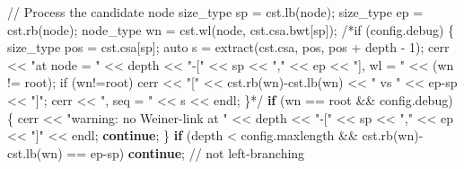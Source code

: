 \documentclass[
]{article}
\newenvironment{Shaded}{\begin{snugshade}}{\end{snugshade}}
\newcommand{\CommentTok}[1]{\textcolor[rgb]{0.48,0.49,0.49}{#1}}
\newcommand{\ControlFlowTok}[1]{\textcolor[rgb]{0.99,0.74,0.29}{\textbf{#1}}}
\newcommand{\NormalTok}[1]{\textcolor[rgb]{0.81,0.81,0.76}{#1}}
\newcommand{\OperatorTok}[1]{\textcolor[rgb]{0.81,0.81,0.76}{#1}}
\newcommand{\StringTok}[1]{\textcolor[rgb]{0.96,0.31,0.31}{#1}}
\begin{document}
\begin{Shaded}
\begin{Highlighting}[]
        \CommentTok{// Process the candidate node}
\NormalTok{        size\_type sp }\OperatorTok{=}\NormalTok{ cst}\OperatorTok{.}\NormalTok{lb}\OperatorTok{(}\NormalTok{node}\OperatorTok{);}
\NormalTok{        size\_type ep }\OperatorTok{=}\NormalTok{ cst}\OperatorTok{.}\NormalTok{rb}\OperatorTok{(}\NormalTok{node}\OperatorTok{);}
\NormalTok{        node\_type wn }\OperatorTok{=}\NormalTok{ cst}\OperatorTok{.}\NormalTok{wl}\OperatorTok{(}\NormalTok{node}\OperatorTok{,}\NormalTok{ cst}\OperatorTok{.}\NormalTok{csa}\OperatorTok{.}\NormalTok{bwt}\OperatorTok{[}\NormalTok{sp}\OperatorTok{]);}
        \CommentTok{/*if (config.debug)}
\CommentTok{        \{}
\CommentTok{            size\_type pos = cst.csa[sp];}
\CommentTok{            auto s = extract(cst.csa, pos, pos + depth {-} 1);}
\CommentTok{            cerr \textless{}\textless{} "at node = " \textless{}\textless{} depth \textless{}\textless{} "{-}[" \textless{}\textless{} sp \textless{}\textless{} "," \textless{}\textless{} ep \textless{}\textless{} "], wl = " \textless{}\textless{} (wn != root);}
\CommentTok{            if (wn!=root)}
\CommentTok{                cerr \textless{}\textless{} "[" \textless{}\textless{} cst.rb(wn){-}cst.lb(wn) \textless{}\textless{} " vs " \textless{}\textless{} ep{-}sp \textless{}\textless{} "]";}
\CommentTok{            cerr \textless{}\textless{} ", seq = " \textless{}\textless{} s \textless{}\textless{} endl;}
\CommentTok{            \}*/}
        \ControlFlowTok{if} \OperatorTok{(}\NormalTok{wn }\OperatorTok{==}\NormalTok{ root }\OperatorTok{\&\&}\NormalTok{ config}\OperatorTok{.}\NormalTok{debug}\OperatorTok{)}
        \OperatorTok{\{}
\NormalTok{            cerr }\OperatorTok{\textless{}\textless{}} \StringTok{"warning: no Weiner{-}link at "} \OperatorTok{\textless{}\textless{}}\NormalTok{ depth }\OperatorTok{\textless{}\textless{}} \StringTok{"{-}["} \OperatorTok{\textless{}\textless{}}\NormalTok{ sp }\OperatorTok{\textless{}\textless{}} \StringTok{","} \OperatorTok{\textless{}\textless{}}\NormalTok{ ep }\OperatorTok{\textless{}\textless{}} \StringTok{"]"} \OperatorTok{\textless{}\textless{}}\NormalTok{ endl}\OperatorTok{;}
            \ControlFlowTok{continue}\OperatorTok{;}
        \OperatorTok{\}}
        \ControlFlowTok{if} \OperatorTok{(}\NormalTok{depth }\OperatorTok{\textless{}}\NormalTok{ config}\OperatorTok{.}\NormalTok{maxlength }\OperatorTok{\&\&}\NormalTok{ cst}\OperatorTok{.}\NormalTok{rb}\OperatorTok{(}\NormalTok{wn}\OperatorTok{){-}}\NormalTok{cst}\OperatorTok{.}\NormalTok{lb}\OperatorTok{(}\NormalTok{wn}\OperatorTok{)} \OperatorTok{==}\NormalTok{ ep}\OperatorTok{{-}}\NormalTok{sp}\OperatorTok{)}
            \ControlFlowTok{continue}\OperatorTok{;} \CommentTok{// not left{-}branching}


\end{Highlighting}
\end{Shaded}
\end{document}
